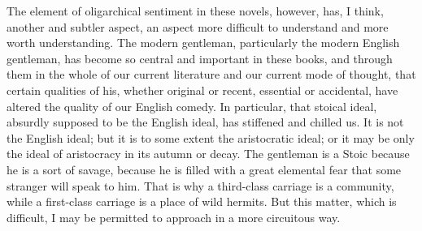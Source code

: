 The element of oligarchical sentiment in these novels, however, has, I think, another and subtler aspect, an aspect more difficult to understand and more worth understanding. The modern gentleman, particularly the modern English gentleman, has become so central and important in these books, and through them in the whole of our current literature and our current mode of thought, that certain qualities of his, whether original or recent, essential or accidental, have altered the quality of our English comedy. In particular, that stoical ideal, absurdly supposed to be the English ideal, has stiffened and chilled us. It is not the English ideal; but it is to some extent the aristocratic ideal; or it may be only the ideal of aristocracy in its autumn or decay. The gentleman is a Stoic because he is a sort of savage, because he is filled with a great elemental fear that some stranger will speak to him. That is why a third-class carriage is a community, while a first-class carriage is a place of wild hermits. But this matter, which is difficult, I may be permitted to approach in a more circuitous way.

